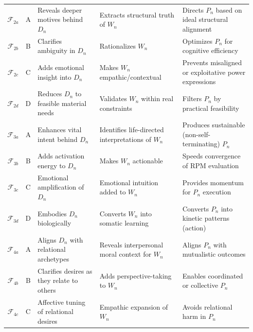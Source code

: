 \documentclass[11pt,twoside,openright]{book}
\theoremstyle{definition}
\theoremstyle{plain}
\theoremstyle{remark}
\newcommand{\Foundations}{\mathcal{F}}
\begin{document}
\begin{longtable}{c|c|p{3.5cm}|p{3.5cm}|p{4cm}}
\midrule

$\Foundations_{2a}$ & A & Reveals deeper motives behind $D_n$
& Extracts structural truth of $W_n$
& Directs $P_n$ based on ideal structural alignment \\

$\Foundations_{2b}$ & B & Clarifies ambiguity in $D_n$
& Rationalizes $W_n$
& Optimizes $P_n$ for cognitive efficiency \\

$\Foundations_{2c}$ & C & Adds emotional insight into $D_n$
& Makes $W_n$ empathic/contextual
& Prevents misaligned or exploitative power expressions \\

$\Foundations_{2d}$ & D & Reduces $D_n$ to feasible material needs
& Validates $W_n$ within real constraints
& Filters $P_n$ by practical feasibility \\

\midrule

$\Foundations_{3a}$ & A & Enhances vital intent behind $D_n$
& Identifies life-directed interpretations of $W_n$
& Produces sustainable (non-self-terminating) $P_n$ \\

$\Foundations_{3b}$ & B & Adds activation energy to $D_n$
& Makes $W_n$ actionable
& Speeds convergence of RPM evaluation \\

$\Foundations_{3c}$ & C & Emotional amplification of $D_n$
& Emotional intuition added to $W_n$
& Provides momentum for $P_n$ execution \\

$\Foundations_{3d}$ & D & Embodies $D_n$ biologically
& Converts $W_n$ into somatic learning
& Converts $P_n$ into kinetic patterns (action) \\

\midrule

$\Foundations_{4a}$ & A & Aligns $D_n$ with relational archetypes
& Reveals interpersonal moral context for $W_n$
& Aligns $P_n$ with mutualistic outcomes \\

$\Foundations_{4b}$ & B & Clarifies desires as they relate to others
& Adds perspective-taking to $W_n$
& Enables coordinated or collective $P_n$ \\

$\Foundations_{4c}$ & C & Affective tuning of relational desires
& Empathic expansion of $W_n$
& Avoids relational harm in $P_n$ \\


\end{longtable}
\end{document}
